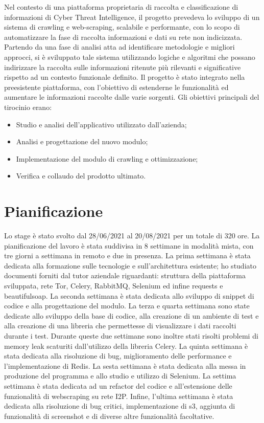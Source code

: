 Nel contesto di una piattaforma proprietaria di raccolta e classificazione di informazioni di Cyber Threat Intelligence, il progetto prevedeva lo sviluppo di un sistema di crawling e web-scraping, scalabile e performante, con lo scopo di automatizzare la fase di raccolta informazioni e dati su rete non indicizzata. Partendo da una fase di analisi atta ad identificare metodologie e migliori approcci, si è sviluppato tale sistema utilizzando logiche e algoritmi che possano indirizzare la raccolta sulle informazioni ritenute più rilevanti e significative rispetto ad un contesto funzionale definito.\newline{}
Il progetto è stato integrato nella preesistente piattaforma, con l'obiettivo di estenderne le funzionalità ed aumentare le informazioni raccolte dalle varie sorgenti.\newline{} Gli obiettivi principali del tirocinio erano: \newline{}
\begin{itemize}
	\item Studio e analisi dell'applicativo utilizzato dall’azienda;
	\item Analisi e progettazione del nuovo modulo;
	\item Implementazione del modulo di crawling e ottimizzazione;
	\item Verifica e collaudo del prodotto ultimato.
\end{itemize}
\section{Pianificazione}
Lo stage è stato svolto dal 28/06/2021 al 20/08/2021 per un totale di 320 ore. La pianificazione del lavoro è stata suddivisa in 8 settimane in modalità mista, con tre giorni a settimana in remoto e due in presenza. La prima settimana è stata dedicata alla formazione sulle tecnologie e sull'architettura esistente; ho studiato documenti forniti dal tutor aziendale riguardanti: struttura della piattaforma sviluppata, rete Tor, Celery, RabbitMQ, Selenium ed infine requests e beautifulsoap.\newline{}
La seconda settimana è stata dedicata allo sviluppo di snippet di codice e alla progettazione del modulo. \newline{}
La terza e quarta settimana sono state dedicate allo sviluppo della base di codice, alla creazione di un ambiente di test e alla creazione di una libreria che permettesse di visualizzare i dati raccolti durante i test. Durante queste due settimane sono inoltre stati risolti problemi di memory leak scaturiti dall'utilizzo della libreria Celery.
La quinta settimana è stata dedicata alla risoluzione di bug, miglioramento delle performance e l'implementazione di Redis.
La sesta settimana è stata dedicata alla messa in produzione del programma e allo studio e utilizzo di Selenium.
La settima settimana è stata dedicata ad un refactor del codice e all'estensione delle funzionalità di webscraping su rete I2P.
Infine, l'ultima settimana è stata dedicata alla risoluzione di bug critici, implementazione di s3, aggiunta di funzionalità di screenshot e di diverse altre funzionalità facoltative.
